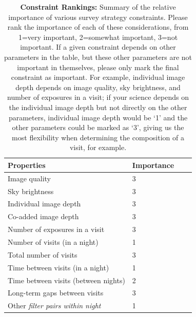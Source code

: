 \documentclass[12pt, letterpaper]{article}
\begin{document}
\vspace{.3in}

\begin{table}[ht]
    \centering
    \begin{tabular}{|l|l|l|l}
        \toprule
        Properties & Importance \hspace{.3in} \\
        \midrule
        Image quality &   3  \\
        Sky brightness &  3\\
        Individual image depth & 3  \\
        Co-added image depth &   3\\
        Number of exposures in a visit   &  3 \\
        Number of visits (in a night)  &  1 \\ 
        Total number of visits &   3\\
        Time between visits (in a night) & 1 \\
        Time between visits (between nights)  & 2  \\
        Long-term gaps between visits & 3\\
        Other \emph{filter pairs within night} & 1 \\
        \bottomrule
    \end{tabular}
    \caption{{\bf Constraint Rankings:} Summary of the relative importance of various survey strategy constraints. Please rank the importance of each of these considerations, from 1=very important, 2=somewhat important, 3=not important. If a given constraint depends on other parameters in the table, but these other parameters are not important in themselves, please only mark the final constraint as important. For example, individual image depth depends on image quality, sky brightness, and number of exposures in a visit; if your science depends on the individual image depth but not directly on the other parameters, individual image depth would be `1' and the other parameters could be marked as `3', giving us the most flexibility when determining the composition of a visit, for example.}
        \label{tab:obs_constraints}
\end{table}
\end{document}
